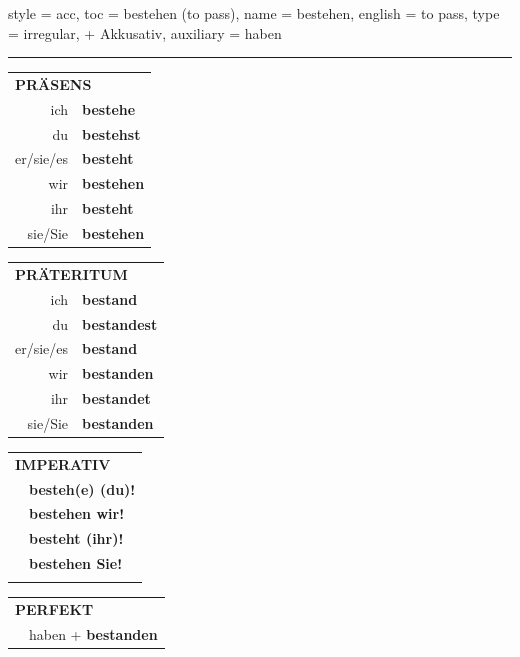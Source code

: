 \begin{verbentry}{
  style = {acc},
  toc = {bestehen (to pass)},
  name = {bestehen},
  english = {to pass},
  type = {irregular, + Akkusativ},
  auxiliary = {haben}
}
 
    
     \vspace{5pt}

    \hrule
    
    \vspace{5pt}

  \begin{tabular}{rl}
     \multicolumn{2}{l}{\textbf{PRÄSENS} }\\
    ich & \textbf{bestehe}\\
    du & \textbf{bestehst}\\
    er/sie/es & \textbf{besteht}\\
    wir & \textbf{bestehen}\\
    ihr & \textbf{besteht}\\
    sie/Sie & \textbf{bestehen}\\
  \end{tabular}
  \hfill
     \begin{tabular}{rl}
    \multicolumn{2}{l}{\textbf{PRÄTERITUM} }\\
    ich & \textbf{bestand}\\
    du & \textbf{bestandest}\\
    er/sie/es & \textbf{bestand}\\
    wir & \textbf{bestanden}\\
    ihr & \textbf{bestandet}\\
    sie/Sie & \textbf{bestanden}\\
  \end{tabular}
  \hfill
  \begin{tabular}{rl}
     \multicolumn{2}{l}{\textbf{IMPERATIV} }\\
   & \textbf{besteh(e) (du)!}\\
   & \textbf{bestehen wir!}\\
   & \textbf{besteht (ihr)!}\\
   & \textbf{bestehen Sie!}\\
   & \vspace{10pt}
  \end{tabular}

    \vspace{10pt}

 \begin{tabular}{rl}
     \multicolumn{2}{l}{\textbf{PERFEKT}}\\
  &  haben + \textbf{bestanden}\\
  \end{tabular}
\hfill
   \begin{tabular}{rl}
   

\end{tabular}
\end{verbentry}
